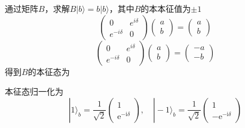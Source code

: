 通过矩阵$B$，求解$B|b \rangle=b|b \rangle$，其中$B$的本本征值为$\pm1$
$$
\left(\begin{array}{ll}
0 & e^{i \delta} \\
e^{-i \delta} & 0
\end{array}\right)\left(\begin{array}{l}
a \\
b
\end{array}\right)=\left(\begin{array}{l}
a \\
b
\end{array}\right)
$$
$$
\left(\begin{array}{ll}
0 & e^{i \delta} \\
e^{-i \delta} & 0
\end{array}\right)\left(\begin{array}{l}
a \\
b
\end{array}\right)=\left(\begin{array}{l}
-a \\
-b
\end{array}\right)
$$
得到$B$的本征态为

本征态归一化为
$$
|1\rangle_{b}=\frac{1}{\sqrt{2}}\left(\begin{array}{c}
1 \\
\mathrm{e}^{-\mathrm{i} \delta}
\end{array}\right), \quad|-1\rangle_{b}=\frac{1}{\sqrt{2}}\left(\begin{array}{c}
1 \\
-\mathrm{e}^{-\mathrm{i} \delta}
\end{array}\right)
$$
